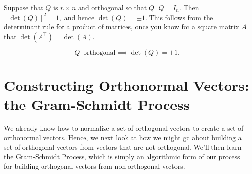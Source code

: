 \begin{tcolorbox}[title=\textbf{\large Determinants of Orthogonal Matrices}]
Suppose that $Q$ is $n \times n$ and orthogonal so that $Q^\top Q = I_n$. Then 
$\left[\det(Q)\right]^2 = 1, $
and hence $\det(Q) = \pm 1.$ 
This follows from the determinant rule for a product of matrices, once you know for a square matrix $A$ that $\det(A^\top)=\det(A).$ 

$$Q~\text{ orthogonal} \implies \det(Q) = \pm 1.$$
\end{tcolorbox}









\section{Constructing Orthonormal Vectors: the Gram-Schmidt Process}

We already know how to normalize a set of orthogonal vectors to create a set of orthonormal vectors. Hence, we next look at how we might go about building a set of orthogonal vectors from vectors that are not orthogonal. We'll then learn the Gram-Schmidt Process, which is simply an algorithmic form of our process for building orthogonal vectors from non-orthogonal vectors. 

